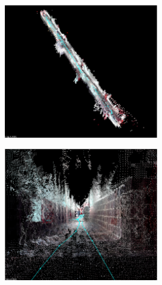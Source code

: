 % 

\begin{minipage}{\linewidth}
    \centering
    \includegraphics[width=0.5\textwidth]{images/cap4/Interiores-rtabmap-lejos.eps}
    \label{fig:Interiores-Rtabmap-Lejos}
\end{minipage}

\begin{minipage}{\linewidth}
    \centering
    \includegraphics[width=0.5\textwidth]{images/cap4/Interiores-rtabmap-cerca.eps}
    \label{fig:Interiores-Rtabmap-Cerca}
\end{minipage}

